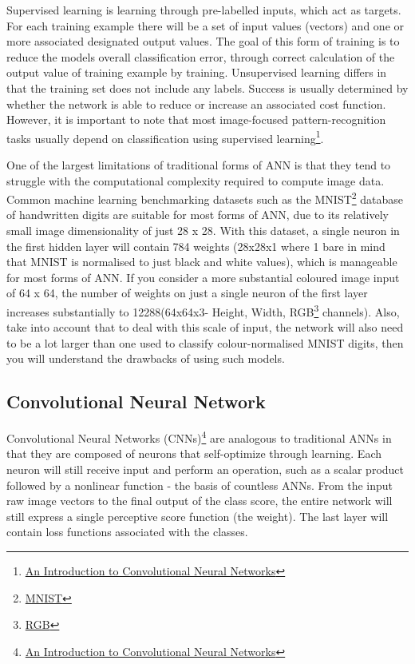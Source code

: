 Supervised learning is learning through pre-labelled inputs, which act as targets. For each training example there will be a set of input values (vectors) and one or more associated designated output values. The goal of this form of training is to reduce the models overall classification error, through correct calculation of the output value of training example by training. 
Unsupervised learning differs in that the training set does not include any labels. Success is usually determined by whether the network is able to reduce or increase an associated cost function. However, it is important to note that most image-focused pattern-recognition tasks usually depend on classification using supervised learning\footnote{\href{https://arxiv.org/pdf/1511.08458.pdf}{An Introduction to Convolutional Neural Networks}}.

One of the largest limitations of traditional forms of ANN is that they tend to struggle with the computational complexity required to compute image data. Common machine learning benchmarking datasets such as the MNIST\footnote{\href{http://yann.lecun.com/exdb/mnist/}{MNIST}} database of handwritten digits are suitable for most forms of ANN, due to its relatively small image dimensionality of just 28 x 28. With this dataset, a single neuron in the first hidden layer will contain 784 weights (28x28x1 where 1 bare in mind that MNIST is normalised to just black and white values), which is manageable for most forms of ANN. If you consider a more substantial coloured image input of 64 x 64, the number of weights on just a single neuron of the first layer increases substantially to 12288(64x64x3- Height, Width, RGB\footnote{\href{https://en.wikipedia.org/wiki/RGB_color_model}{RGB}}
 channels). Also, take into account that to deal with this scale of input, the network will also need to be a lot larger than one used to classify colour-normalised MNIST digits, then you will understand the drawbacks of using such models.


\subsection{Convolutional Neural Network}

Convolutional Neural Networks (CNNs)\footnote{\href{https://arxiv.org/pdf/1511.08458.pdf}{An Introduction to Convolutional Neural Networks}} are analogous to traditional ANNs in that they are composed of neurons that self-optimize through learning. Each neuron will still receive input and perform an operation, such as a scalar product followed by a nonlinear function - the basis of countless ANNs. From the input raw image vectors to the final output of the class score, the entire network will still express a single perceptive score function (the weight). The last layer will contain loss functions associated with the classes.

